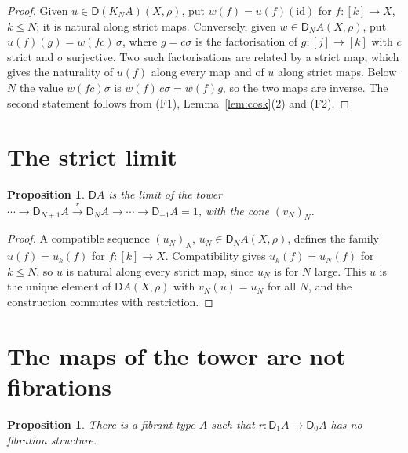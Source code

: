 \documentclass[11pt]{article}
\newcommand{\id}{\mathrm{id}}
\newcommand{\D}{\mathsf{D}}
\theoremstyle{plain}
\newtheorem{proposition}[theorem]{Proposition}
\theoremstyle{definition}
\theoremstyle{remark}
\begin{document}
\begin{proof}
Given $u\in\D(K_NA)(X,\rho)$, put $w(f)=u(f)(\id)$ for $f:[k]\to X$, $k\le
N$; it is natural along strict maps. Conversely, given $w\in\D_NA(X,\rho)$,
put $u(f)(g)=w(fc)\,\sigma$, where $g=c\sigma$ is the factorisation of
$g:[j]\to[k]$ with $c$ strict and $\sigma$ surjective. Two such
factorisations are related by a strict map, which gives the naturality of
$u(f)$ along every map and of $u$ along strict maps. Below $N$ the value
$w(fc)\sigma$ is $w(f)\,c\sigma=w(f)g$, so the two maps are inverse. The
second statement follows from (F1), Lemma~\ref{lem:cosk}(2) and (F2).
\end{proof}

\section{The strict limit}\label{sec:strict}

\begin{proposition}\label{prop:strict}
$\D A$ is the limit of the tower
$\cdots\to\D_{N+1}A\xrightarrow{r}\D_NA\to\cdots\to\D_{-1}A=1$, with the
cone $(v_N)_N$.
\end{proposition}

\begin{proof}
A compatible sequence $(u_N)_N$, $u_N\in\D_NA(X,\rho)$, defines the family
$u(f)=u_k(f)$ for $f:[k]\to X$. Compatibility gives $u_k(f)=u_N(f)$ for
$k\le N$, so $u$ is natural along every strict map, since $u_N$ is for
$N$ large. This $u$ is the unique element of $\D A(X,\rho)$ with
$v_N(u)=u_N$ for all $N$, and the construction commutes with restriction.
\end{proof}

\section{The maps of the tower are not fibrations}\label{sec:notfib}

\begin{proposition}\label{prop:notfib}
There is a fibrant type $A$ such that $r:\D_1A\to\D_0A$ has no fibration
structure.
\end{proposition}
\end{document}

